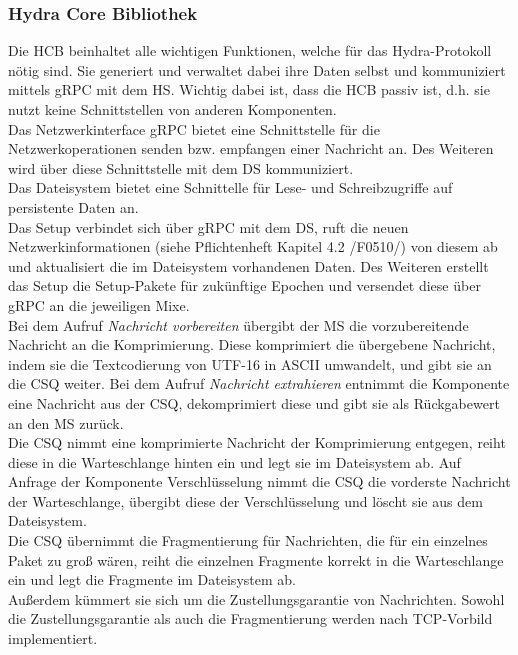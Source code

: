 \subsubsection{Hydra Core Bibliothek}
Die \ac{HCB} beinhaltet alle wichtigen Funktionen, welche für das Hydra-Protokoll nötig sind. Sie generiert und verwaltet dabei ihre Daten selbst und kommuniziert mittels \ac{gRPC} mit dem \ac{HS}. Wichtig dabei ist, dass die \ac{HCB} passiv ist, d.h. sie nutzt keine Schnittstellen von anderen Komponenten.\\
\newline
Das Netzwerkinterface \ac{gRPC} bietet eine Schnittstelle für die Netzwerkoperationen senden bzw. empfangen einer Nachricht an. Des Weiteren wird über diese Schnittstelle mit dem \ac{DS} kommuniziert.\\
\newline
Das Dateisystem bietet eine Schnittelle für Lese- und Schreibzugriffe auf persistente Daten an.\\
\newline
Das Setup verbindet sich über \ac{gRPC} mit dem \ac{DS}, ruft die neuen Netzwerkinformationen (siehe Pflichtenheft Kapitel 4.2 /F0510/) von diesem ab und aktualisiert die im Dateisystem vorhandenen Daten. Des Weiteren erstellt das Setup die Setup-Pakete für zukünftige Epochen und versendet diese über \ac{gRPC} an die jeweiligen Mixe.\\
\newline
Bei dem Aufruf \textit{Nachricht vorbereiten} übergibt der \ac{MS} die vorzubereitende Nachricht an die Komprimierung. Diese komprimiert die übergebene Nachricht, indem sie die Textcodierung von UTF-16 in ASCII umwandelt, und gibt sie an die \ac{CSQ} weiter.
Bei dem Aufruf \textit{Nachricht extrahieren} entnimmt die Komponente eine Nachricht aus der \ac{CSQ}, dekomprimiert diese und gibt sie als Rückgabewert an den \ac{MS} zurück.\\
\newline
Die \ac{CSQ} nimmt eine komprimierte Nachricht der Komprimierung entgegen, reiht diese in die Warteschlange hinten ein und legt sie im Dateisystem ab. Auf Anfrage der Komponente Verschlüsselung nimmt die \ac{CSQ} die vorderste Nachricht der Warteschlange, übergibt diese der Verschlüsselung und löscht sie aus dem Dateisystem.\\
Die \ac{CSQ} übernimmt die Fragmentierung für Nachrichten, die für ein einzelnes Paket zu groß wären, reiht die einzelnen Fragmente korrekt in die Warteschlange ein und legt die Fragmente im Dateisystem ab. \\
Außerdem kümmert sie sich um die Zustellungsgarantie von Nachrichten. Sowohl die Zustellungsgarantie als auch die Fragmentierung werden nach TCP-Vorbild implementiert.\\
\newline

